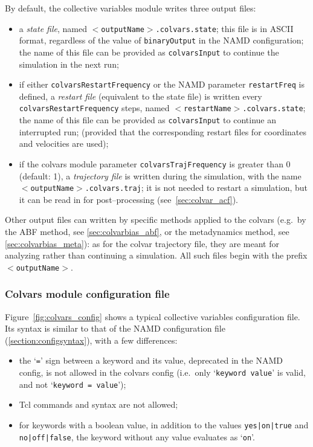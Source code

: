 By default, the collective variables module writes three output
files:
\begin{itemize}

\item a \emph{state file}, named
  \texttt{$<$outputName$>$.colvars.state}; this file is in ASCII
  format, regardless of the value of \texttt{binaryOutput} in the NAMD
  configuration; the name of this file can be provided as
  \texttt{colvarsInput} to continue the simulation in the next run;

\item if either \texttt{colvarsRestartFrequency} or the NAMD parameter
  \texttt{restartFreq} is defined, a
  \emph{restart file} (equivalent to the state file) is written every
  \texttt{colvarsRestartFrequency} steps, named
  \texttt{$<$restartName$>$.colvars.state}; the name of this file
  can be provided as \texttt{colvarsInput} to continue an interrupted run;
  (provided that the corresponding restart files for coordinates
  and velocities are used);

\item if the colvars module parameter \texttt{colvarsTrajFrequency} is
  greater than 0 (default: 1), a \emph{trajectory file} is written
  during the simulation, with the name
  \texttt{$<$outputName$>$.colvars.traj}; it is not needed to restart
  a simulation, but it can be read in for post--processing
  (see~\ref{sec:colvar_acf}).

\end{itemize}

Other output files can written by specific methods applied to the
colvars (e.g.~by the ABF method, see \ref{sec:colvarbias_abf}, or the
metadynamics method, see \ref{sec:colvarbias_meta}): as for the colvar
trajectory file, they are meant for analyzing rather than continuing a
simulation. All such files begin with the prefix
\texttt{$<$outputName$>$}.


\subsubsection{Colvars module configuration file}

Figure~\ref{fig:colvars_config} shows a typical collective variables
configuration file. Its syntax is similar to that of the
NAMD configuration file (\ref{section:configsyntax}), with a few
differences:
\begin{itemize}
\item the `\texttt{=}' sign between a keyword and its value,
  deprecated in the NAMD config, is not allowed in the colvars config
  (i.e.~only `\texttt{keyword value}' is valid, and not
  `\texttt{keyword = value}');
\item Tcl commands and syntax are not allowed;
\item for keywords with a boolean value, in addition to the values
  \texttt{yes|on|true} and \texttt{no|off|false}, the keyword without
  any value evaluates as `\texttt{on}'.
\end{itemize}

